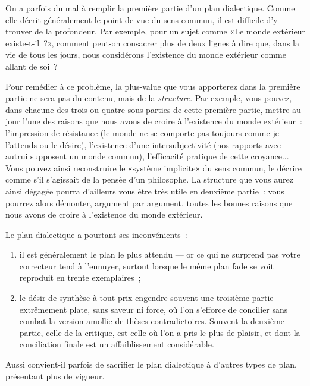 \documentclass[a4paper,11pt]{article}
\begin{document}
\par

On a parfois du mal à remplir la première partie d'un plan dialectique.
Comme elle décrit généralement le point de vue du sens commun, il est
difficile d'y trouver de la profondeur. Par exemple, pour un sujet comme
«Le monde extérieur existe-t-il~?», comment peut-on consacrer plus de
deux lignes à dire que, dans la vie de tous les jours, nous considérons
l'existence du monde extérieur comme allant de soi~?

\par

Pour remédier à ce problème, la plus-value que vous apporterez dans la
première partie ne sera pas du contenu, mais de la \emph{structure}. Par
exemple, vous pouvez, dans chacune des trois ou quatre sous-parties de
cette première partie, mettre au jour l'une des raisons que nous avons
de croire à l'existence du monde extérieur~: l'impression de résistance
(le monde ne se comporte pas toujours comme je l'attends ou le désire),
l'existence d'une intersubjectivité (nos rapports avec autrui supposent
un monde commun), l'efficacité pratique de cette croyance... Vous pouvez
ainsi reconstruire le «système implicite» du sens commun, le décrire
comme s'il s'agissait de la pensée d'un philosophe. La structure que
vous aurez ainsi dégagée pourra d'ailleurs vous être très utile en
deuxième partie~: vous pourrez alors démonter, argument par argument,
toutes les bonnes raisons que nous avons de croire à l'existence du
monde extérieur.

\par

Le plan dialectique a pourtant ses inconvénients~:
\begin{enumerate}
\item il est généralement le plan le plus attendu --- or ce qui ne
  surprend pas votre correcteur tend à l'ennuyer, surtout lorsque le
  même plan fade se voit reproduit en trente exemplaires~;
\item le désir de synthèse à tout prix engendre souvent une troisième
  partie extrêmement plate, sans saveur ni force, où l'on s'efforce de
  concilier sans combat la version amollie de thèses
  contradictoires. Souvent la deuxième partie, celle de la critique, est
  celle où l'on a pris le plus de plaisir, et dont la conciliation
  finale est un affaiblissement considérable.
\end{enumerate}

Aussi convient-il parfois de sacrifier le plan dialectique à d'autres
types de plan, présentant plus de vigueur.
\end{document}

